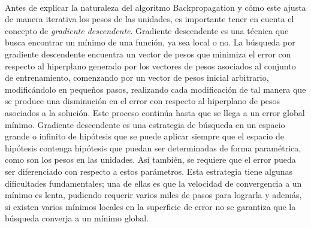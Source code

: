 \paragraph{}Antes de explicar la naturaleza del algoritmo Backpropagation y cómo este ajusta de manera iterativa los pesos de las unidades, es importante tener en cuenta el concepto de \textit{gradiente descendente}. Gradiente descendente es una técnica que busca encontrar un mínimo de una función, ya sea local o no. La búsqueda por gradiente descendente encuentra un vector de pesos que minimiza el error con respecto al hiperplano generado por los vectores de pesos asociados al conjunto de entrenamiento, comenzando por un vector de pesos inicial arbitrario, modificándolo en pequeños pasos, realizando cada modificación de tal manera que se produce una disminución en el error con respecto al hiperplano de pesos asociados a la solución. Este proceso continúa hasta que se llega a un error global mínimo. Gradiente descendente es una estrategia de búsqueda en un espacio grande o infinito de hipótesis que se puede aplicar siempre que el espacio de hipótesis contenga hipótesis que puedan ser determinadas de forma paramétrica, como son los pesos en las unidades. Así también, se requiere que el error pueda ser diferenciado con respecto a estos parámetros. Esta estrategia tiene algunas dificultades fundamentales; una de ellas es que la velocidad de convergencia a un mínimo es lenta, pudiendo requerir varios miles de pasos para lograrla y además, si existen varios mínimos locales en la superficie de error no se garantiza que la búsqueda converja a un mínimo global.

